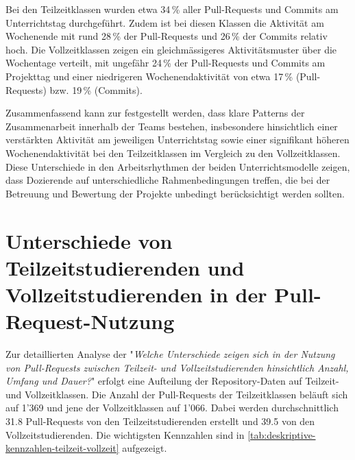 Bei den Teilzeitklassen wurden etwa 34\,\% aller Pull-Requests und Commits am Unterrichtstag durchgeführt. Zudem ist bei diesen Klassen die Aktivität am Wochenende mit rund 28\,\% der Pull-Requests und 26\,\% der Commits relativ hoch. Die Vollzeitklassen zeigen ein gleichmässigeres Aktivitätsmuster über die Wochentage verteilt, mit ungefähr 24\,\% der Pull-Requests und Commits am Projekttag und einer niedrigeren Wochenendaktivität von etwa 17\,\% (Pull-Requests) bzw. 19\,\% (Commits).

Zusammenfassend kann zur  festgestellt werden, dass klare Patterns der Zusammenarbeit innerhalb der Teams bestehen, insbesondere hinsichtlich einer verstärkten Aktivität am jeweiligen Unterrichtstag sowie einer signifikant höheren Wochenendaktivität bei den Teilzeitklassen im Vergleich zu den Vollzeitklassen.
Diese Unterschiede in den Arbeitsrhythmen der beiden Unterrichtsmodelle zeigen, dass Dozierende auf unterschiedliche Rahmenbedingungen treffen, die bei der Betreuung und Bewertung der Projekte unbedingt berücksichtigt werden sollten.
\section{Unterschiede von Teilzeitstudierenden und Vollzeitstudierenden in der Pull-Request-Nutzung}
Zur detaillierten Analyse der  "\textit{Welche Unterschiede zeigen sich in der Nutzung von Pull-Requests zwischen Teilzeit- und Vollzeitstudierenden hinsichtlich Anzahl, Umfang und Dauer?}" erfolgt eine Aufteilung der Repository-Daten auf Teilzeit- und Vollzeitklassen. Die Anzahl der Pull-Requests der Teilzeitklassen beläuft sich auf 1'369 und jene der Vollzeitklassen auf 1'066. Dabei werden durchschnittlich 31.8 Pull-Requests von den Teilzeitstudierenden erstellt und 39.5 von den Vollzeitstudierenden. Die wichtigsten Kennzahlen sind in \autoref{tab:deskriptive-kennzahlen-teilzeit-vollzeit} aufgezeigt.

